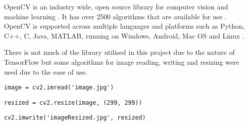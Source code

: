 OpenCV is an industry wide, open source library for computer vision and machine learning \parencite{opencv}.
It has over 2500 algorithms that are available for use \parencite{opencv}.
OpenCV is supported across multiple languages and platforms such as Python, C++, C, Java, MATLAB, running on Windows, Android, Mac OS and Linux \parencite{opencv}.

There is not much of the library utilised in this project due to the nature of TensorFlow but some algorithms for image reading, writing and resizing were used due to the ease of use.

\begin{lstlisting}
image = cv2.imread('image.jpg')
\end{lstlisting}

\begin{lstlisting}
resized = cv2.resize(image, (299, 299))
\end{lstlisting}

\begin{lstlisting}
cv2.imwrite('imageResized.jpg', resized)
\end{lstlisting}

